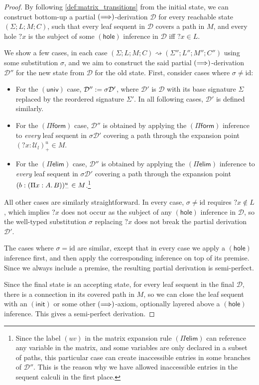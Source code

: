 \documentclass[twoside]{report}
\begin{document}
\begin{proof}
    By following \cref{def:matrix_transitions} from the initial state, we can construct bottom-up a partial $(\Longrightarrow)$-derivation $\mathcal D$ for every reachable state $(\Sigma; L; M; C)$, such that every leaf sequent in $\mathcal D$ covers a path in $M$, and every hole ${?x}$ is the subject of some $(\mathsf{hole})$ inference in $\mathcal D$ iff ${?x} \in L$.

    We show a few cases, in each case $(\Sigma; L; M; C) \rightsquigarrow (\Sigma''; L''; M''; C'')$ using some substitution $\sigma$, and we aim to construct the said partial $(\Longrightarrow)$-derivation $\mathcal D''$ for the new state from $\mathcal D$ for the old state. First, consider cases where $\sigma \neq \mathrm{id}$:
    \begin{itemize}
        \item For the $(\mathsf{univ})$ case, $\mathcal D'' := \sigma \mathcal D'$, where $\mathcal D'$ is $\mathcal D$ with its base signature $\Sigma$ replaced by the reordered signature $\Sigma'$. In all following cases, $\mathcal D'$ is defined similarly.

        \item For the $(\Pi\mathsf{form})$ case, $\mathcal D''$ is obtained by applying the $(\Pi\mathsf{form})$ inference to \emph{every} leaf sequent in $\sigma \mathcal D'$ covering a path through the expansion point $({?x} : \mathcal U_l)^u_+ \in M$.

        \item For the $(\Pi\mathsf{elim})$ case, $\mathcal D''$ is obtained by applying the $(\Pi\mathsf{elim})$ inference to \emph{every} leaf sequent in $\sigma \mathcal D'$ covering a path through the expansion point $(b : (\Pi{x} : {A}.\,{B}))^u_- \in M$.\footnote{Since the label $(uv)$ in the matrix expansion rule $(\Pi\mathsf{elim})$ can reference any variable in the matrix, and some variables are only declared in a subset of paths, this particular case can create inaccessible entries in some branches of $\mathcal D''$. This is the reason why we have allowed inaccessible entries in the sequent calculi in the first place.}
    \end{itemize}
    All other cases are similarly straightforward. In every case, $\sigma \neq \mathrm{id}$ requires ${?x} \notin L$, which implies ${?x}$ does not occur as the subject of any $(\mathsf{hole})$ inference in $\mathcal D$, so the well-typed substitution $\sigma$ replacing ${?x}$ does not break the partial derivation $\mathcal D'$.

    The cases where $\sigma = \mathrm{id}$ are similar, except that in every case we apply a $(\mathsf{hole})$ inference first, and then apply the corresponding inference on top of its premise. Since we always include a premise, the resulting partial derivation is semi-perfect.

    Since the final state is an accepting state, for every leaf sequent in the final $\mathcal D$, there is a connection in its covered path in $M$, so we can close the leaf sequent with an $(\mathsf{init})$ or some other $(\Longrightarrow)$-axiom, optionally layered above a $(\mathsf{hole})$ inference. This gives a semi-perfect derivation.
\end{proof}
\end{document}

